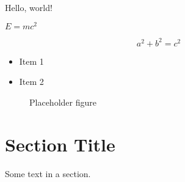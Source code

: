 
\



Hello, world!

$E=mc^2$

\begin{equation}
a^2 + b^2 = c^2
\end{equation}

\begin{itemize}
    \item Item 1
    \item Item 2
\end{itemize}

\begin{figure}[h]
    \centering
    \caption{Placeholder figure}
    \label{fig:placeholder}
\end{figure}

\section*{Section Title}

Some text in a section.



